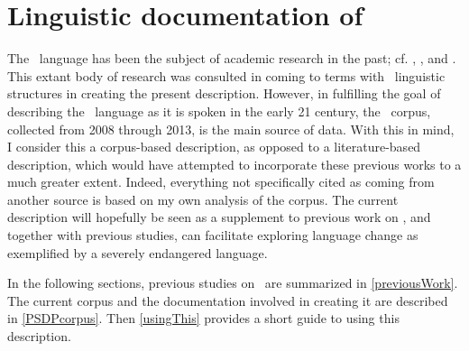 \FB

\section{Linguistic documentation of \PS}\label{lingDoc}
The \PS\ language has been the subject of academic research in the past; cf. \citet{Halasz1896}, \citet{Lagercrantz1926}, \citet{Ruong1943} and \citet{Lehtiranta1992}. %
This extant body of research was consulted in coming to terms with \PS\ linguistic structures in creating the present description. 
However, in fulfilling the goal of describing the \PS\ language as it is spoken in the early 21 century, the \PSDP\ corpus, collected from 2008 through 2013, is the main source of data. With this in mind, I consider this a corpus-based description, as opposed to a literature-based description, which would have attempted to incorporate these previous works to a much greater extent. Indeed, everything not specifically cited as coming from another source is based on my own analysis of the corpus. 
The current description will hopefully be seen as a supplement to previous work on \PS, and together with previous studies, can facilitate exploring language change as exemplified by a severely endangered language. 

In the following sections, previous studies on \PS\ are summarized in \SEC\ref{previousWork}. The current corpus and the documentation involved in creating it are described in \SEC\ref{PSDPcorpus}. Then \SEC\ref{usingThis} provides a short guide to using this description. 

